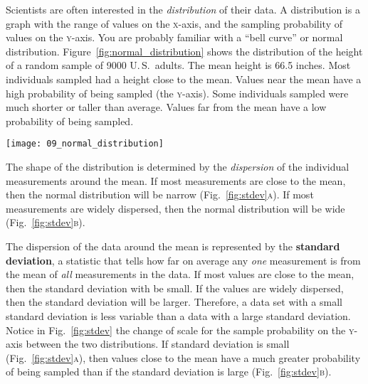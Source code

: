 \documentclass[12pt]{exam}
\begin{document}
\begin{questions}
Scientists are often interested in the \emph{distribution} of their
data. A distribution is a graph with the range of values on the \textsc{x}-axis,
and the sampling probability of values on the \textsc{y}-axis. You are probably familiar
with a ``bell curve'' or normal distribution. Figure~\ref{fig:normal_distribution} 
shows the distribution of the height of a random sample of 9000 U.\,S.\ adults.
The mean height is 66.5 inches. Most individuals sampled had a height close
to the mean. Values near the mean have a high probability of being sampled 
(the \textsc{y}-axis). Some individuals sampled were much shorter or taller than average.
Values far from the mean have a low probability of being sampled.

\medskip

\hfil\begin{minipage}{0.8\textwidth}
	\texttt{[image: 09\_normal\_distribution]}
\end{minipage}\hfill

\medskip

The shape of the distribution is determined by the \emph{dispersion} of the 
individual measurements around the mean. If most measurements are close 
to the mean, then the normal distribution will be narrow (Fig.~\ref{fig:stdev}\textsc{a}).
If most measurements are widely dispersed, then the normal distribution will be
wide (Fig.~\ref{fig:stdev}\textsc{b}). 

The dispersion of the data around the mean is represented by the
\textbf{standard deviation}, a statistic that tells how far on average any
\emph{one} measurement is from the mean of \emph{all} measurements in 
the data. If most values are close to the mean, then the standard deviation
with be small. If the values are widely dispersed, then the standard deviation
will be larger. Therefore, a data set with a small standard deviation is less 
variable than a data with a large standard deviation. Notice in Fig.~\ref{fig:stdev} the change of scale 
for the sample probability on the
\textsc{y}-axis between the two distributions. If standard deviation is small 
(Fig.~\ref{fig:stdev}\textsc{a}), then values close to the mean have a much greater 
probability of being sampled than if the standard deviation is large (Fig.~\ref{fig:stdev}\textsc{b}).


\medskip


\end{questions}
\end{document}
